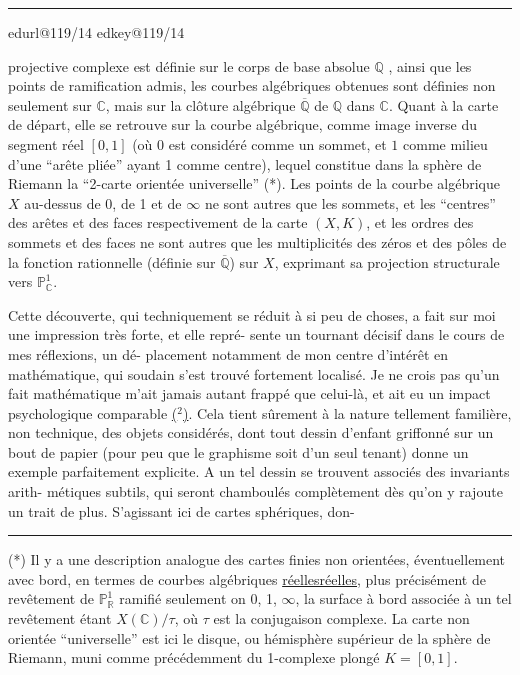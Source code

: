 \documentclass[11pt,a4paper]{article}
\makeatletter
\newif\ifreading
\def\CurrentScanURL{}
\def\CurrentPageKey{}
\def\CurrentApparatus{}
\newcommand{\scanpage}[1]{%
  \clearpage
  \expandafter\let\expandafter\CurrentScanURL\csname edurl@#1\endcsname
  \expandafter\let\expandafter\CurrentPageKey\csname edkey@#1\endcsname
  \def\CurrentApparatus{}%
  \hypertarget{scan-\CurrentPageKey}{}%
  \typeout{EDITION-SCAN: \CurrentPageKey; PDFPAGE: \the\numexpr\ReadonlyShipoutCounter+1\relax}%
  \ifreading
    \marginnote{\raggedright\scriptsize\sffamily\href{\CurrentScanURL}{119 / \csname edpage@#1\endcsname}}%
  \else
    \noindent{\small\sffamily\href{\CurrentScanURL}{[scan #1]}}\par\smallskip
  \fi}
\newcommand{\mspage}[1]{%
  \ifreading\marginnote{\raggedright\scriptsize\sffamily p.\,#1}[2\baselineskip]%
  \else\noindent{\small\sffamily[p.\,#1]}\par\smallskip\fi}
\let\TextUline\uline
\renewcommand{\uline}[1]{\ifmmode\underline{#1}\else\TextUline{#1}\fi}
\newcommand{\finishscan}{\ifx\CurrentApparatus\empty\else\par\bigskip\noindent\rule{.35\linewidth}{.35pt}\par\smallskip{\footnotesize\setlength{\parskip}{3pt}\CurrentApparatus}\fi}
\newcommand{\notecall}[3]{\hypertarget{#2}{\hyperlink{note-#1}{#3}}}
\makeatother
\begin{document}
\finishscan
\scanpage{119/14}
\mspage{12}

projective complexe est définie sur le corps de base absolue $\mathbb{Q}$ ,
ainsi que les points de ramification admis, les courbes algébriques
obtenues sont définies non seulement sur $\mathbb{C}$, mais sur la clôture
algébrique $\overline{\mathbb{Q}}$ de $\mathbb{Q}$ dans $\mathbb{C}$. Quant à la carte de départ, elle se
retrouve sur la courbe algébrique, comme image inverse du segment
réel $[0,1]$ (où $0$ est considéré comme un sommet, et $1$ comme
milieu d'une ``arête pliée'' ayant 1 comme centre), lequel constitue
dans la sphère de Riemann la ``2-carte orientée universelle'' (*).
Les points de la courbe algébrique $X$ au-dessus de 0, de 1 et de $\infty$
ne sont autres que les sommets, et les ``centres'' des arêtes et des
faces respectivement de la carte $(X,K)$, et les ordres des sommets
et des faces ne sont autres que les multiplicités des zéros et
des pôles de la fonction rationnelle (définie sur $\overline{\mathbb{Q}}$) sur $X$,
exprimant sa projection structurale vers $\mathbb{P}^1_{\mathbb{C}}$.

Cette découverte, qui techniquement se réduit à si peu
de choses, a fait sur moi une impression très forte, et elle repré-%
sente un tournant décisif dans le cours de mes réflexions, un dé-%
placement notamment de mon centre d'intérêt en mathématique, qui
soudain s'est trouvé fortement localisé. Je ne crois pas qu'un
fait mathématique m'ait jamais autant frappé que celui-là, et ait
eu un impact psychologique comparable \notecall{copy1-2}{call-esq_119_014-2-1}{($^2$)}. Cela tient sûrement à la
nature tellement familière, non technique, des objets considérés,
dont tout dessin d'enfant griffonné sur un bout de papier (pour peu
que le graphisme soit d'un seul tenant) donne un exemple parfaitement
explicite. A un tel dessin se trouvent associés des invariants arith-%
métiques subtils, qui seront chamboulés complètement dès qu'on y
rajoute un trait de plus. S'agissant ici de cartes sphériques, don-%

\noindent\rule{4cm}{0.4pt}

(*) Il y a une description analogue des cartes finies non orientées,
éventuellement avec bord, en termes de courbes algébriques \uline{réelles},
plus précisément de revêtement de $\mathbb{P}^1_{\mathbb{R}}$ ramifié seulement on 0, 1, $\infty$,
la surface à bord associée à un tel revêtement étant $X(\mathbb{C})/\tau$, où $\tau$
est la conjugaison complexe. La carte non orientée ``universelle'' est
ici le disque, ou hémisphère supérieur de la sphère de Riemann, muni
comme précédemment du 1-complexe plongé $K = [0,1]$.
\end{document}
